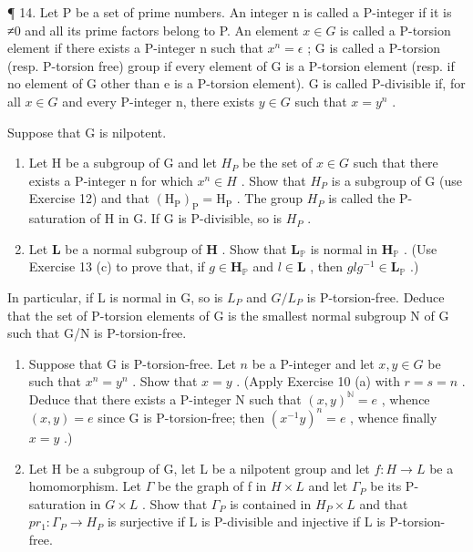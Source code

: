 ¶ 14. Let P be a set of prime numbers. An integer n is called a P-integer if it is ≠0 and all its prime factors belong to P. An element \(x \in G\) is called a P-torsion element if there exists a P-integer n such that \(x^{n} = \epsilon\) ; G is called a P-torsion (resp. P-torsion free) group if every element of G is a P-torsion element (resp. if no element of G other than e is a P-torsion element). G is called P-divisible if, for all \(x \in G\) and every P-integer n, there exists \(y \in G\) such that \(x = y^{n}\) .

Suppose that G is nilpotent.

\begin{enumerate}
\def\labelenumi{(\alph{enumi})}
\item
  Let H be a subgroup of G and let \(H_{P}\) be the set of \(x \in G\) such that there exists a P-integer n for which \(x^{n} \in H\) . Show that \(H_{P}\) is a subgroup of G (use Exercise 12) and that \((\mathrm{H}_{\mathrm{P}})_{\mathrm{P}} = \mathrm{H}_{\mathrm{P}}\) . The group \(H_{P}\) is called the P-saturation of H in G. If G is P-divisible, so is \(H_{P}\) .
\item
  Let \(\mathbf{L}\) be a normal subgroup of \(\mathbf{H}\) . Show that \(\mathbf{L}_{\mathbb{P}}\) is normal in \(\mathbf{H}_{\mathbb{P}}\) . (Use Exercise 13 (c) to prove that, if \(g \in \mathbf{H}_{\mathbb{P}}\) and \(l \in \mathbf{L}\) , then \(glg^{-1} \in \mathbf{L}_{\mathbb{P}}\) .)
\end{enumerate}

In particular, if L is normal in G, so is \(L_{P}\) and \(G/L_{P}\) is P-torsion-free. Deduce that the set of P-torsion elements of G is the smallest normal subgroup N of G such that G/N is P-torsion-free.

\begin{enumerate}
\def\labelenumi{(\alph{enumi})}
\setcounter{enumi}{2}
\item
  Suppose that G is P-torsion-free. Let \(n\) be a P-integer and let \(x, y \in G\) be such that \(x^n = y^n\) . Show that \(x = y\) . (Apply Exercise 10 (a) with \(r = s = n\) . Deduce that there exists a P-integer N such that \((x, y)^{\mathbb{N}} = e\) , whence \((x, y) = e\) since G is P-torsion-free; then \((x^{-1}y)^n = e\) , whence finally \(x = y\) .)
\item
  Let H be a subgroup of G, let L be a nilpotent group and let \(f: H \to L\) be a homomorphism. Let \(\Gamma\) be the graph of f in \(H \times L\) and let \(\Gamma_{P}\) be its P-saturation in \(G \times L\) . Show that \(\Gamma_{P}\) is contained in \(H_{P} \times L\) and that \(pr_{1}: \Gamma_{P} \to H_{P}\) is surjective if L is P-divisible and injective if L is P-torsion-free.
\end{enumerate}

